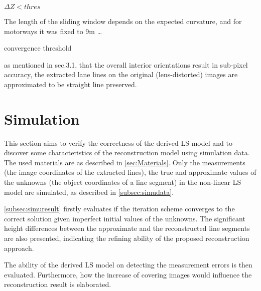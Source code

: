 $\Delta Z < thres$



The length of the sliding window depends on the expected curvature, and for motorways it was fixed to 9m …






convergence threshold 




as mentioned in sec.3.1, that the overall interior orientations result in sub-pixel accuracy, the extracted lane lines on the original (lens-distorted) images are approximated to be straight line preserved.



\section{Simulation}
\label{sec:simulation}
This section aims to verify the correctness of the derived LS model and to discover some characteristics of the reconstruction model using simulation data. The used materials are as described in \cref{sec:Materials}. Only the measurements (the image coordinates of the extracted lines), the true and approximate values of the unknowns (the object coordinates of a line segment) in the non-linear LS model are simulated, as described in \cref{subsec:simudata}.

\cref{subsec:simuresult} firstly evaluates if the iteration scheme converges to the correct solution given imperfect initial values of the unknowns. The significant height differences between the approximate and the reconstructed line segments are also presented, indicating the refining ability of the proposed reconstruction approach.

The ability of the derived LS model on detecting the measurement errors is then evaluated. Furthermore, how the increase of covering images would influence the reconstruction result is elaborated.





